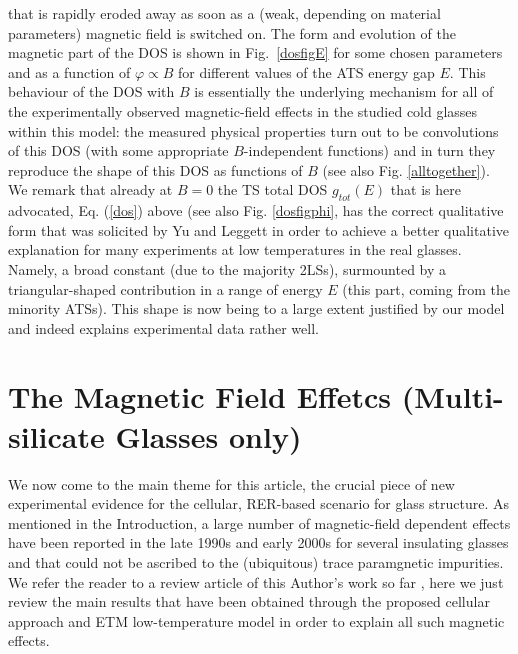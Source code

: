 \documentclass[10pt]{article}
\begin{document}
that is rapidly eroded away as soon as a (weak, depending on material parameters) 
magnetic field is switched on. The form and evolution of the magnetic part 
of the DOS is shown in Fig.~\ref{dosfigE} for some chosen parameters and as a 
function of $\varphi\propto B$ for different values of the ATS energy gap $E$.
This behaviour of the DOS with $B$ is essentially the underlying mechanism
for all of the experimentally observed magnetic-field effects in the studied cold
glasses within this model: the measured physical properties turn out to be 
convolutions of this DOS (with some appropriate $B$-independent functions) and 
in turn they reproduce the shape of this DOS as functions of $B$ (see also 
Fig. \ref{alltogether}). We remark that already at $B=0$ the TS total DOS 
$g_{tot}(E)$ that is here advocated, Eq. (\ref{dos}) above (see also 
Fig. \ref{dosfigphi}, has the correct qualitative form that was solicited by Yu and 
Leggett \cite{CYu1988} in order to achieve a better qualitative explanation for 
many experiments at low temperatures in the real glasses. Namely, a broad constant 
(due to the majority 2LSs), surmounted by a triangular-shaped contribution in a 
range of energy $E$ (this part, coming from the minority ATSs). This shape is now 
being to a large extent justified by our model and indeed explains experimental data  
rather well. 

\section{The Magnetic Field Effetcs (Multi-silicate Glasses only)}
We now come to the main theme for this article, the crucial piece of new 
experimental evidence for the cellular, RER-based scenario for glass structure. 
As mentioned in the Introduction, a large number of magnetic-field dependent
effects have been reported in the late 1990s and early 2000s for several insulating
glasses and that could not be ascribed to the (ubiquitous) trace paramgnetic 
impurities. We refer the reader to a review article of this Author's work so far \cite{JBK2016}, here we just review the main results that have been obtained 
through the proposed cellular approach and ETM low-temperature model in order 
to explain all such magnetic effects.
\end{document}
